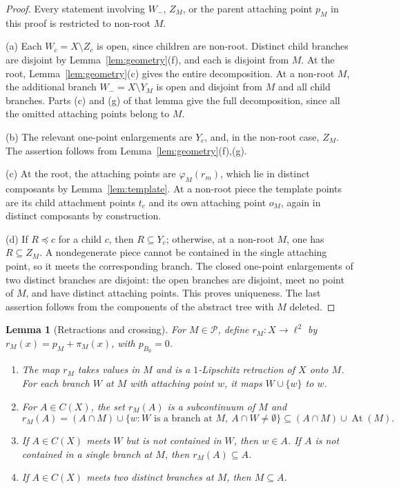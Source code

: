 \documentclass[11pt]{amsart}
\newtheorem{lemma}[theorem]{Lemma}
\theoremstyle{definition}
\theoremstyle{remark}
\newcommand{\At}{\operatorname{At}}
\newcommand{\Pc}{\mathcal{P}}
\begin{document}
\begin{proof}
Every statement involving $W_-$, $Z_M$, or the parent attaching point $p_M$ in this proof is restricted to non-root $M$.

(a) Each $W_c=X\setminus Z_c$ is open, since children are non-root. Distinct child branches are disjoint by Lemma~\ref{lem:geometry}(f), and each is disjoint from $M$. At the root, Lemma~\ref{lem:geometry}(c) gives the entire decomposition. At a non-root $M$, the additional branch $W_-=X\setminus Y_M$ is open and disjoint from $M$ and all child branches. Parts (c) and (g) of that lemma give the full decomposition, since all the omitted attaching points belong to $M$.

(b) The relevant one-point enlargements are $Y_c$, and, in the non-root case, $Z_M$. The assertion follows from Lemma~\ref{lem:geometry}(f),(g).

(c) At the root, the attaching points are $\varphi_M(r_m)$, which lie in distinct composants by Lemma~\ref{lem:template}. At a non-root piece the template points are its child attachment points $t_c$ and its own attaching point $o_M$, again in distinct composants by construction.

(d) If $R\preceq c$ for a child $c$, then $R\subseteq Y_c$; otherwise, at a non-root $M$, one has $R\subseteq Z_M$. A nondegenerate piece cannot be contained in the single attaching point, so it meets the corresponding branch. The closed one-point enlargements of two distinct branches are disjoint: the open branches are disjoint, meet no point of $M$, and have distinct attaching points. This proves uniqueness. The last assertion follows from the components of the abstract tree with $M$ deleted.
\end{proof}

\begin{lemma}[Retractions and crossing]\label{lem:retraction}
For $M\in\Pc$, define $r_M\colon X\to\ell^2$ by $r_M(x)=p_M+\pi_M(x)$, with $p_{B_\emptyset}=0$.
\begin{enumerate}[label=\textup{(\roman*)}]
\item The map $r_M$ takes values in $M$ and is a $1$-Lipschitz retraction of $X$ onto $M$. For each branch $W$ at $M$ with attaching point $w$, it maps $W\cup\{w\}$ to $w$.
\item For $A\in C(X)$, the set $r_M(A)$ is a subcontinuum of $M$ and
\[
r_M(A)=(A\cap M)\cup\{w: W\text{ is a branch at }M,\ A\cap W\neq\emptyset\}\subseteq(A\cap M)\cup\At(M).
\]
\item If $A\in C(X)$ meets $W$ but is not contained in $W$, then $w\in A$. If $A$ is not contained in a single branch at $M$, then $r_M(A)\subseteq A$.
\item If $A\in C(X)$ meets two distinct branches at $M$, then $M\subseteq A$.
\end{enumerate}
\end{lemma}
\end{document}
